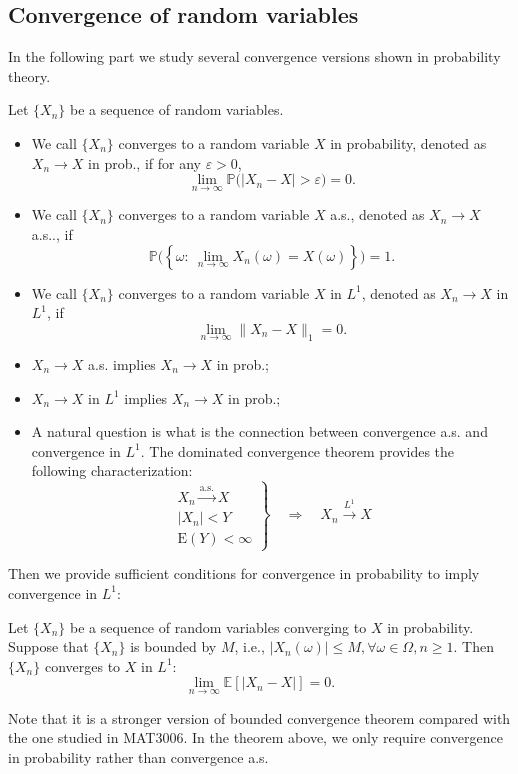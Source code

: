 \subsection{Convergence of random variables}

In the following part we study several convergence versions shown in probability theory.
\begin{definition}
Let $\{X_n\}$ be a sequence of random variables. 
\begin{itemize}
\item
We call $\{X_n\}$ converges to a random variable $X$ in probability, denoted as $X_n\to X$ in prob., if for any $\varepsilon>0$,
\[
\lim_{n\to\infty}\mathbb{P}\bigg(
|X_n-X|>\varepsilon
\bigg)=0.
\]
\item
We call $\{X_n\}$ converges to a random variable $X$ a.s., denoted as $X_n\to X$ a.s.., if 
\[
\mathbb{P}\bigg(
\left\{\omega:~
\lim_{n\to\infty}X_n(\omega)=X(\omega)
\right\}
\bigg)=1.
\]
\item
We call $\{X_n\}$ converges to a random variable $X$ in $L^1$, denoted as $X_n\to X$ in $L^1$, if
\[
\lim_{n\to\infty}\|X_n-X\|_1=0.
\]
\end{itemize}
\end{definition}
\begin{remark}
\begin{itemize}
\item
$X_n\to X$ a.s. implies $X_n\to X$ in prob.;
\item
$X_n\to X$ in $L^1$ implies $X_n\to X$ in prob.;
\item
A natural question is what is the connection between convergence a.s. and convergence in $L^1$.
The dominated convergence theorem provides the following characterization:
\[
{\displaystyle \left.{\begin{matrix}X_{n}{\xrightarrow {\overset {}{\text{a.s.}}}}X\\|X_{n}|<Y\\\mathrm {E} (Y)<\infty \end{matrix}}\right\}\quad \Rightarrow \quad X_{n}{\xrightarrow {L^{1}}}X}
\]
\end{itemize}
\end{remark}
Then we provide sufficient conditions for convergence in probability to imply convergence in $L^1$:
\begin{theorem}\label{The:BCT}
Let $\{X_n\}$ be a sequence of random variables converging to $X$ in probability.
Suppose that $\{X_n\}$ is bounded by $M$, i.e., $|X_n(\omega)|\le M,\forall \omega\in\Omega, n\ge1$. Then $\{X_n\}$ converges to $X$ in $L^1$:
\[
\lim_{n\to\infty}\mathbb{E}[|X_n-X|]=0.
\]
\end{theorem}
\begin{remark}
Note that it is a stronger version of bounded convergence theorem compared with the one studied in MAT3006. 
In the theorem above, we only require convergence in probability rather than convergence a.s.
\end{remark}

